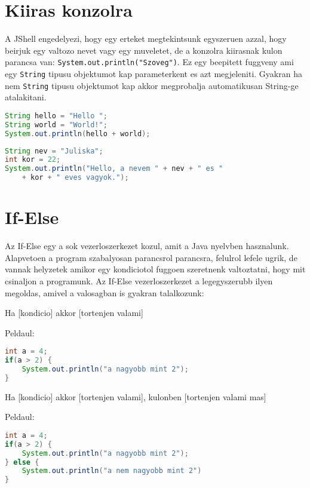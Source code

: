 \documentclass{article}
\begin{document}
\newpage

\section{Kiiras konzolra}

A JShell engedelyezi, hogy egy erteket megtekintsunk egyszeruen azzal, hogy beirjuk egy valtozo nevet vagy egy muveletet, de a konzolra kiirasnak kulon parancsa van: \lstinline{System.out.println("Szoveg")}.
Ez egy beepitett fuggveny ami egy \lstinline{String} tipusu objektumot kap parameterkent es azt megjeleniti. Gyakran ha nem \lstinline{String} tipusu objektumot kap akkor megprobalja automatikusan String-ge atalakitani.

\begin{lstlisting}[language=Java, caption=Konzolra kiiras 1.]
String hello = "Hello ";
String world = "World!";
System.out.println(hello + world);
\end{lstlisting}

\begin{lstlisting}[language=Java, caption=Konzolra kiiras 2.]
String nev = "Juliska";
int kor = 22;
System.out.println("Hello, a nevem " + nev + " es "
    + kor + " eves vagyok.");
\end{lstlisting}

\newpage

\section{If-Else}

Az If-Else egy a sok vezerloszerkezet kozul, amit a Java nyelvben hasznalunk. Alapvetoen a program szabalyosan parancsrol parancsra, felulrol lefele ugrik, de vannak helyzetek amikor egy kondiciotol fuggoen szeretnenk valtoztatni, hogy mit csinaljon a programunk. Az If-Else vezerloszerkezet a legegyszerubb ilyen megoldas, amivel a valosagban is gyakran talalkozunk:

Ha [kondicio] akkor [tortenjen valami]

Peldaul:
\begin{lstlisting}[language=Java, caption=If hasznalata]
int a = 4;
if(a > 2) {
    System.out.println("a nagyobb mint 2");
}
\end{lstlisting}

Ha [kondicio] akkor [tortenjen valami], kulonben [tortenjen valami mas]

Peldaul:
\begin{lstlisting}[language=Java, caption=If hasznalata]
int a = 4;
if(a > 2) {
    System.out.println("a nagyobb mint 2");
} else {
    System.out.println("a nem nagyobb mint 2")
}
\end{lstlisting}
\end{document}
